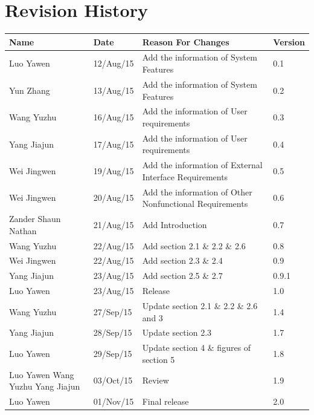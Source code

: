 \documentclass[11pt, a4paper]{article}
\begin{document}
\section*{Revision History}
\small
\begin{tabular} 
	 {|m{3cm}|m{2cm}|m{8cm}|m{2cm}|}
	\hline
	\textbf{Name} &  \textbf{Date} & \textbf{Reason For Changes} & \textbf{Version} \\ [0.5ex]
	\hline
	Luo Yawen & 12/Aug/15 & Add the information of System Features & 0.1 \\ [0.5ex]
	\hline
	Yun Zhang & 13/Aug/15 & Add the information of System Features & 0.2 \\ [0.5ex]
	\hline
	Wang Yuzhu & 16/Aug/15 & Add the information of User requirements & 0.3 \\ [0.5ex]
	\hline
	Yang Jiajun & 17/Aug/15 & Add the information of User requirements & 0.4 \\ [0.5ex]
	\hline
	Wei Jingwen & 19/Aug/15 & Add the information of External Interface Requirements & 0.5 \\ [0.5ex]
	\hline
	Wei Jingwen & 20/Aug/15 & Add the information of Other Nonfunctional Requirements & 0.6 \\ [0.5ex]
	\hline
	Zander Shaun Nathan & 21/Aug/15 & Add Introduction & 0.7 \\ [0.5ex]
	\hline
	Wang Yuzhu & 22/Aug/15 & Add section 2.1 \& 2.2 \& 2.6 & 0.8 \\ [0.5ex]
	\hline
	Wei Jingwen & 22/Aug/15 & Add section 2.3 \& 2.4 & 0.9 \\ [0.5ex]
	\hline
	Yang Jiajun & 23/Aug/15 & Add section 2.5 \& 2.7 & 0.9.1 \\ [0.5ex]
	\hline
	Luo Yawen & 23/Aug/15 & Release & 1.0 \\ [0.5ex]
	\hline
	Wang Yuzhu & 27/Sep/15 & Update section 2.1 \& 2.2 \& 2.6 and 3 & 1.4 \\ [0.5ex]
	\hline
	Yang Jiajun & 28/Sep/15 & Update section 2.3 & 1.7 \\ [0.5ex]
	\hline
	Luo Yawen & 29/Sep/15 & Update section 4 \& figures of section 5 & 1.8 \\ [0.5ex]
	\hline
	Luo Yawen \newline  Wang Yuzhu \newline Yang Jiajun & 03/Oct/15 & Review & 1.9 \\ [0.5ex]
	\hline
	Luo Yawen & 01/Nov/15 & Final release & 2.0 \\ [0.5ex]
	\hline

\end{tabular}
\cleardoublepage
\end{document}
